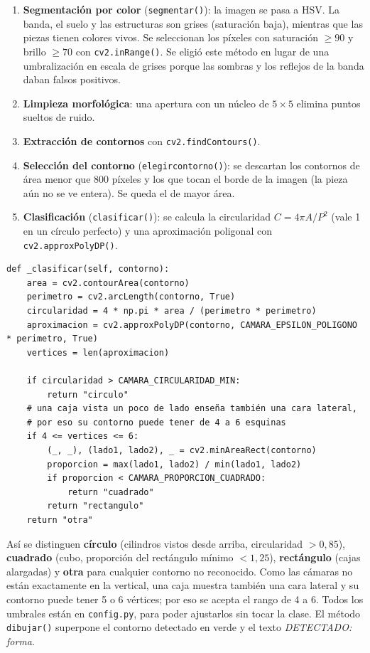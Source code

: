 \documentclass[12pt,a4paper]{article}
\renewcommand{\_}{\guionbajo\allowbreak}
\begin{document}
\begin{enumerate}
    \item \textbf{Segmentación por color} (\texttt{\_segmentar()}): la imagen se pasa a HSV.
          La banda, el suelo y las estructuras son grises (saturación baja), mientras que
          las piezas tienen colores vivos. Se seleccionan los píxeles con saturación
          $\geq 90$ y brillo $\geq 70$ con \texttt{cv2.inRange()}. Se eligió este método en
          lugar de una umbralización en escala de grises porque las sombras y los
          reflejos de la banda daban falsos positivos.
    \item \textbf{Limpieza morfológica}: una apertura con un núcleo de $5\times5$ elimina
          puntos sueltos de ruido.
    \item \textbf{Extracción de contornos} con \texttt{cv2.findContours()}.
    \item \textbf{Selección del contorno} (\texttt{\_elegir\_contorno()}): se descartan los
          contornos de área menor que 800 píxeles y los que tocan el borde de la imagen
          (la pieza aún no se ve entera). Se queda el de mayor área.
    \item \textbf{Clasificación} (\texttt{\_clasificar()}): se calcula la circularidad
          $C = 4\pi A / P^2$ (vale 1 en un círculo perfecto) y una aproximación poligonal
          con \texttt{cv2.approxPolyDP()}.
\end{enumerate}
\clearpage
\begin{lstlisting}[caption={Clasificación de la forma a partir del contorno.}]
def _clasificar(self, contorno):
    area = cv2.contourArea(contorno)
    perimetro = cv2.arcLength(contorno, True)
    circularidad = 4 * np.pi * area / (perimetro * perimetro)
    aproximacion = cv2.approxPolyDP(contorno, CAMARA_EPSILON_POLIGONO * perimetro, True)
    vertices = len(aproximacion)

    if circularidad > CAMARA_CIRCULARIDAD_MIN:
        return "circulo"
    # una caja vista un poco de lado enseña también una cara lateral,
    # por eso su contorno puede tener de 4 a 6 esquinas
    if 4 <= vertices <= 6:
        (_, _), (lado1, lado2), _ = cv2.minAreaRect(contorno)
        proporcion = max(lado1, lado2) / min(lado1, lado2)
        if proporcion < CAMARA_PROPORCION_CUADRADO:
            return "cuadrado"
        return "rectangulo"
    return "otra"
\end{lstlisting}

Así se distinguen \textbf{círculo} (cilindros vistos desde arriba, circularidad
$> 0{,}85$), \textbf{cuadrado} (cubo, proporción del rectángulo mínimo $< 1{,}25$),
\textbf{rectángulo} (cajas alargadas) y \textbf{otra} para cualquier contorno no
reconocido. Como las cámaras no están exactamente en la vertical, una caja muestra también
una cara lateral y su contorno puede tener 5 o 6 vértices; por eso se acepta el rango de 4
a 6. Todos los umbrales están en \texttt{config.py}, para poder ajustarlos sin tocar la
clase. El método \texttt{dibujar()} superpone el contorno detectado en verde y el texto
\textit{DETECTADO: forma}.
\end{document}
